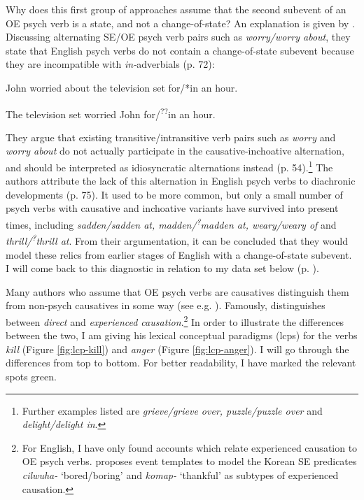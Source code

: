 Why does this first group of approaches assume that the second subevent of an OE psych verb is a state, and not a change-of-state? An explanation is given by \citet{Alexiadou.2014}. Discussing alternating SE/OE psych verb pairs such as \textit{worry/worry about}, they state that English psych verbs do not contain a change-of-state subevent because they are incompatible with \textit{in-}adverbials (p. 72):

\begin{exe}
	\ex
	\begin{xlist}
	\item John worried about the television set for/*in an hour.
	\item The television set worried John for/\textsuperscript{??}in an hour.
	\end{xlist}
\end{exe} 

\noindent They argue that existing transitive/intransitive verb pairs such as \textit{worry} and \textit{worry about} do not actually participate in the causative-inchoative alternation, and should be interpreted as idiosyncratic alternations instead (p. 54).\footnote{Further examples listed are \textit{grieve/grieve over, puzzle/puzzle over} and \textit{delight/delight in}.} The authors attribute the lack of this alternation in English psych verbs to diachronic developments (p. 75). It used to be more common, but only a small number of psych verbs with causative and inchoative variants have survived into present times, including \textit{sadden/sadden at, madden/\textsuperscript{?}madden at, weary/weary of} and \textit{thrill/\textsuperscript{?}thrill at}. From their argumentation, it can be concluded that they would model these relics from earlier stages of English with a change-of-state subevent. I will come back to this diagnostic in relation to my data set below (p. \pageref{enum:VanDiagnostics}).

Many authors who assume that OE psych verbs are causatives distinguish them from non-psych causatives in some way (see e.g. \citealt{Asher.2000,Geuder.2000,Grimshaw.1990,Pustejovsky.1995}).
Famously, \citet{Pustejovsky.1995} distinguishes between \textit{direct} and \textit{experienced causation}.\footnote{For English, I have only found accounts which relate experienced causation to OE psych verbs. \citet{Nam.2009} proposes event templates to model the Korean SE predicates \textit{cilwuha-} `bored/boring' and \textit{komap-} `thankful' as subtypes of experienced causation.} In order to illustrate the differences between the two, I am giving his lexical conceptual paradigms (lcps) for the verbs \textit{kill} (Figure \ref{fig:lcp-kill}) and \textit{anger} (Figure \ref{fig:lcp-anger}). I will go through the differences from top to bottom. For better readability, I have marked the relevant spots green. 

